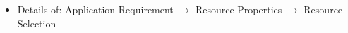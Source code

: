 \documentclass[conference,final]{IEEEtran}
\begin{document}



\begin{itemize} 
\item Details of: Application Requirement $\rightarrow$ Resource Properties 
$\rightarrow$ Resource Selection
\end{itemize}
\end{document}
